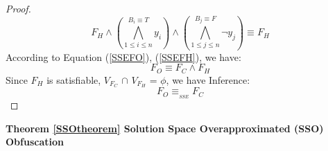 \documentclass[conference,compsocconf]{IEEEtran}
\begin{document}
\begin{proof}
\begin{equation}
F_H \wedge (\bigwedge_{1\leqslant i\leqslant n}^{B_i \equiv T}y_i)\wedge
(\bigwedge_{1\leqslant j\leqslant n}^{B_j\equiv F}\neg y_j)\equiv F_H 
\end{equation}
According to Equation (\ref{SSEFO}), (\ref{SSEFH}), we have:
\begin{equation}\label{SSEEND}
F_O\equiv F_C \wedge F_H 
\end{equation}
Since $F_H$ is satisfiable, $V_{F_C}$ $\cap$ $V_{F_H}$ = $\phi$, we have Inference:
\begin{equation}
F_O\equiv_{_{SSE}}  F_C  
\end{equation}
\end{proof}

\textbf{Theorem \ref{SSOtheorem} Solution Space Overapproximated (SSO) Obfuscation}
\end{document}
